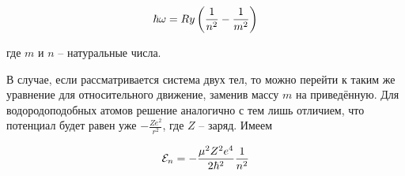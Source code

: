 \begin{equation}
    \hbar \omega = Ry \left( \frac{1}{n^2} - \frac{1}{m^2} \right)
\end{equation}

\noindent
где $m$ и $n$ -- натуральные числа.

В случае, если рассматривается система двух тел, то можно перейти к таким же уравнение для относительного движение, заменив массу $m$ на приведённую. Для водородоподобных атомов решение аналогично с тем лишь отличием, что потенциал будет равен уже $ - \frac{Z e^2}{r^2}$, где $Z$ -- заряд. Имеем

\begin{equation}
    \mathcal{E}_n = - \frac{\mu^2 Z^2 e^4}{2 \hbar^2} \frac{1}{n^2}
\end{equation}